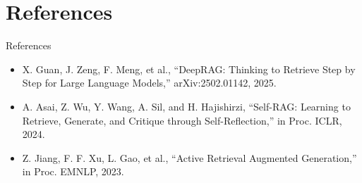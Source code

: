 \documentclass{beamer}
\begin{document}
\section{References}
\begin{frame}{References}
\footnotesize
\begin{itemize}
\item X. Guan, J. Zeng, F. Meng, et al., ``DeepRAG: Thinking to Retrieve Step by Step for Large Language Models,'' arXiv:2502.01142, 2025.
\item A. Asai, Z. Wu, Y. Wang, A. Sil, and H. Hajishirzi, ``Self-RAG: Learning to Retrieve, Generate, and Critique through Self-Reflection,'' in Proc. ICLR, 2024.
\item Z. Jiang, F. F. Xu, L. Gao, et al., ``Active Retrieval Augmented Generation,'' in Proc. EMNLP, 2023.
\end{itemize}
\end{frame}
\begin{frame}\vfill{}\vfill\end{frame}
\end{document}

